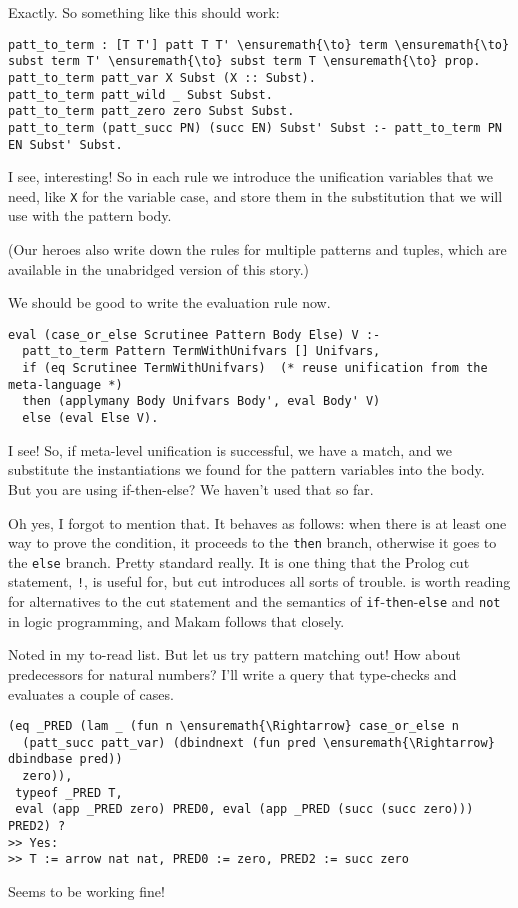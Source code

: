 \heroADVISOR{} Exactly. So something like this should work:

\begin{verbatim}
patt_to_term : [T T'] patt T T' \ensuremath{\to} term \ensuremath{\to} subst term T' \ensuremath{\to} subst term T \ensuremath{\to} prop.
patt_to_term patt_var X Subst (X :: Subst).
patt_to_term patt_wild _ Subst Subst.
patt_to_term patt_zero zero Subst Subst.
patt_to_term (patt_succ PN) (succ EN) Subst' Subst :- patt_to_term PN EN Subst' Subst.
\end{verbatim}

\heroSTUDENT{} I see, interesting! So in each rule we introduce the
unification variables that we need, like \texttt{X} for the variable
case, and store them in the substitution that we will use with the
pattern body.

\begin{scenecomment}
(Our heroes also write down the rules for multiple patterns and tuples, which are
available in the unabridged version of this story.)
\end{scenecomment}

\heroADVISOR{} We should be good to write the evaluation rule now.

\begin{verbatim}
eval (case_or_else Scrutinee Pattern Body Else) V :-
  patt_to_term Pattern TermWithUnifvars [] Unifvars,
  if (eq Scrutinee TermWithUnifvars)  (* reuse unification from the meta-language *)
  then (applymany Body Unifvars Body', eval Body' V)
  else (eval Else V).
\end{verbatim}

\heroSTUDENT{} I see! So, if meta-level unification is successful, we have a
match, and we substitute the instantiations we found for the pattern
variables into the body. But you are using if-then-else? We haven't used
that so far.

\heroADVISOR{} Oh yes, I forgot to mention that. It behaves as follows: when
there is at least one way to prove the condition, it proceeds to the
\texttt{then} branch, otherwise it goes to the \texttt{else} branch.
Pretty standard really. It is one thing that the Prolog cut statement,
\texttt{!}, is useful for, but cut introduces all sorts of trouble.
\citet{kiselyov05backtracking} is worth reading for alternatives to the
cut statement and the semantics of
\texttt{if}-\texttt{then}-\texttt{else} and \texttt{not} in logic
programming, and Makam follows that closely.

\heroSTUDENT{} Noted in my to-read list. But let us try pattern matching out!
How about predecessors for natural numbers? I'll write a query that
type-checks and evaluates a couple of cases.

\begin{verbatim}
(eq _PRED (lam _ (fun n \ensuremath{\Rightarrow} case_or_else n
  (patt_succ patt_var) (dbindnext (fun pred \ensuremath{\Rightarrow} dbindbase pred))
  zero)),
 typeof _PRED T,
 eval (app _PRED zero) PRED0, eval (app _PRED (succ (succ zero))) PRED2) ?
>> Yes:
>> T := arrow nat nat, PRED0 := zero, PRED2 := succ zero
\end{verbatim}

\heroADVISOR{} Seems to be working fine!

